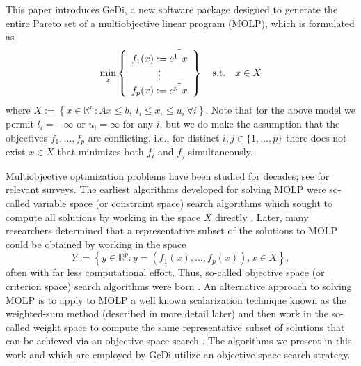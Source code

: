 \documentclass[12pt]{article}
\newcommand{\R}{\mathbb{R}}
\renewcommand{\top}{}
\newcommand*{\tran}{^{\mkern-1.5mu\mathsf{T}}}
\renewcommand{\top}{\tran}
\begin{document}
This paper introduces GeDi, a new software package designed to generate the entire Pareto set of a multiobjective linear program (MOLP), which is formulated as
\begin{equation}\label{MOLP}
\min_{x} \left\{\begin{array}{c} f_1(x) := {c^{1}}^{\top}x \\ 
\vdots\\
f_p(x) := {c^{p}}^{\top}x \end{array}\right\} \quad \text{s.t.} \quad  x \in X
\end{equation}
where $X := \left\{x\in \R^{n} \colon Ax\leq b,\; l_i \leq x_i \leq u_i \ \forall i\right\}$.
Note that for the above model we permit $l_i = -\infty$ or $u_i = \infty$ for any $i$, but we do make the assumption that the objectives $f_1, \dots, f_p$ are conflicting, i.e., for distinct $i,j \in \{1,\dots,p\}$ there does not exist $x \in X$ that minimizes both $f_i$ and $f_j$ simultaneously.

Multiobjective optimization problems have been studied for decades; see \citep{ehrgott2005multicriteria,ehrgott2005multiobjective} for relevant surveys. The earliest algorithms developed for solving MOLP were so-called variable space (or constraint space) search algorithms which sought to compute all solutions by working in the space $X$ directly \citep{armand1993finding,armand1991determination,ecker1980generating,ecker1978finding,
evans1973revised,isermann1977enumeration,zionts1980identifying}. Later, many researchers determined that a representative subset of the solutions to MOLP could be obtained by working in the space 
\begin{equation}\label{Y}
Y := \left\{ y\in \R^p: y = \left(f_1(x), \dots, f_p(x)\right), x \in X \right\},
\end{equation} 
often with far less computational effort. Thus, so-called objective space (or criterion space) search algorithms were born \citep{dauer1990solving,benson1998outer,dauer1987analysis,lohne2011vector,csirmaz2016using,
ehrgott2012dual,hamel2014benson}. An alternative approach to solving MOLP is to apply to MOLP a well known scalarization technique known as the weighted-sum method (described in more detail later) and then work in the so-called weight space to compute the same representative subset of solutions that can be achieved via an objective space search \citep{benson2000outcome,Borndoerfer2016,rudloff2017parametric}. The algorithms we present in this work and which are employed by GeDi utilize an objective space search strategy. 
\end{document}

